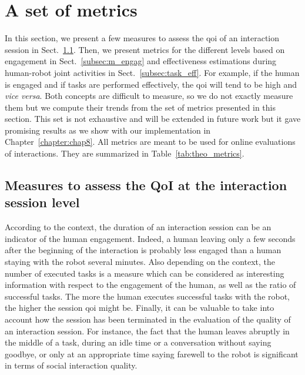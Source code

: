 \documentclass[a4paper,11pt,twoside]{StyleThese}
\begin{document}
\section{A set of metrics}\label{sec:metrics}

In this section, we present a few measures to assess the \acrshort{qoi} of an interaction session in Sect.~\ref{subsec:m_intersess}. Then, we present metrics for the different levels based on engagement in Sect.~\ref{subsec:m_engag} and effectiveness estimations during human-robot joint activities in Sect.~\ref{subsec:task_eff}. For example, if the human is engaged and if tasks are performed effectively, the \acrshort{qoi} will tend to be high and \textit{vice versa}. Both concepts are difficult to measure, so we do not exactly measure them but we compute their trends from the set of metrics presented in this section. This set is not exhaustive and will be extended in future work but it gave promising results as we show with our implementation in Chapter~\ref{chapter:chap8}. All metrics are meant to be used for online evaluations of interactions. They are summarized in Table~\ref{tab:theo_metrics}.


\subsection{Measures to assess the QoI at the interaction session level}\label{subsec:m_intersess}
According to the context, the duration of an interaction session can be an indicator of the human engagement. Indeed, a human leaving only a few seconds after the beginning of the interaction is probably less engaged than a human staying with the robot several minutes. Also depending on the context, the number of executed tasks is a measure which can be considered as interesting information with respect to the engagement of the human, as well as the ratio of successful tasks. The more the human executes successful tasks with the robot, the higher the session \acrshort{qoi} might be. Finally, it can be valuable to take into account how the session has been terminated in the evaluation of the quality of an interaction session. For instance, the fact that the human leaves abruptly in the middle of a task, during an idle time or a conversation without saying goodbye, or only at an appropriate time saying farewell to the robot is significant in terms of social interaction quality.
\end{document}

